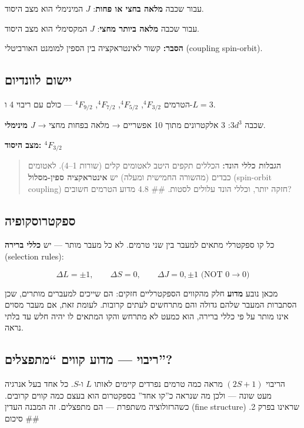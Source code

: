 \documentclass[
  hebrew,
  letterpaper,
  DIV=11,
  numbers=noendperiod]{scrreprt}
\begin{document}
עבור שכבה \textbf{מלאה בחצי או פחות}: \(J\) המינימלי הוא מצב היסוד.

עבור שכבה \textbf{מלאה ביותר מחצי}: \(J\) המקסימלי הוא מצב היסוד.

\textbf{הסבר:} קשור לאינטראקציה בין הספין למומנט האורביטלי (coupling
spin-orbit).

\subsection{יישום
לוונדיום}\label{ux5d9ux5d9ux5e9ux5d5ux5dd-ux5dcux5d5ux5d5ux5e0ux5d3ux5d9ux5d5ux5dd}

הטרמים \(^4F_{3/2}\), \(^4F_{5/2}\), \(^4F_{7/2}\), \(^4F_{9/2}\) ---
כולם עם ריבוי 4 ו-\(L=3\).

שכבה \(3d^3\): 3 אלקטרונים מתוך 10 אפשריים → מלאה בפחות מחצי →
\textbf{\(J\) מינימלי}.

\textbf{מצב היסוד: \(^4F_{3/2}\)}

\begin{quote}
\textbf{הגבלות כללי הונד:} הכללים תקפים היטב לאטומים קלים (שורות 1--4).
לאטומים כבדים (מהשורה החמישית ומעלה) יש \textbf{אינטראקציה ספין-מסלול}
(spin-orbit coupling) חזקה יותר, וכללי הונד עלולים לסטות. \#\# 4.8 מדוע
הטרמים חשובים?
\end{quote}

\subsection{ספקטרוסקופיה}\label{ux5e1ux5e4ux5e7ux5d8ux5e8ux5d5ux5e1ux5e7ux5d5ux5e4ux5d9ux5d4}

כל קו ספקטרלי מתאים למעבר בין שני טרמים. לא כל מעבר מותר --- יש
\textbf{כללי ברירה} (selection rules):

\[\Delta L = \pm 1, \qquad \Delta S = 0, \qquad \Delta J = 0, \pm 1 \text{ (NOT  } 0 \to 0\text{)}\]

מכאן נובע \textbf{מדוע} חלק מהקווים הספקטרליים חזקים: הם שייכים למעברים
מותרים, שכן הסתברות המעבר שלהם גדולה והם מתרחשים לעתים קרובות. לעומת
זאת, אם מעבר מסוים אינו מותר על פי כללי ברירה, הוא כמעט לא מתרחש והקו
המתאים לו יהיה חלש עד בלתי נראה.

\subsection{ריבוי --- מדוע קווים
``מתפצלים''?}\label{ux5e8ux5d9ux5d1ux5d5ux5d9-ux5deux5d3ux5d5ux5e2-ux5e7ux5d5ux5d5ux5d9ux5dd-ux5deux5eaux5e4ux5e6ux5dcux5d9ux5dd}

הריבוי \((2S+1)\) מראה כמה טרמים נפרדים קיימים לאותו \(L\) ו-\(S\). כל
אחד בעל אנרגיה מעט שונה --- ולכן מה שנראה כ''קו אחד'' בספקטרום הוא בעצם
כמה קווים קרובים. כשהרזולוציה משתפרת --- הם מתפצלים. זה המבנה העדין
(fine structure) שראינו בפרק 2. \#\# סיכום
\end{document}
